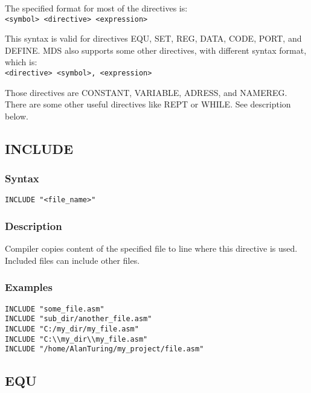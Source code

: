     \bigskip

    The specified format for most of the directives is:\\
    \verb'<symbol> <directive> <expression>'

    \bigskip

    This syntax is valid for directives EQU, SET, REG, DATA, CODE, PORT, and DEFINE. MDS also supports some other directives, with different syntax format, which is:\\
    \verb'<directive> <symbol>, <expression>'

    \bigskip

    Those directives are CONSTANT, VARIABLE, ADRESS, and NAMEREG. There are some other useful directives like REPT or WHILE. See description below.

    \clearpage
    \subsection{INCLUDE}
        \subsubsection{Syntax}
            \verb'INCLUDE "<file_name>"'

        \subsubsection{Description}
            Compiler copies content of the specified file to line where this directive is used. Included files can include other files.

        \subsubsection{Examples}
            \verb'INCLUDE "some_file.asm"'\\
            \verb'INCLUDE "sub_dir/another_file.asm"'\\
            \verb'INCLUDE "C:/my_dir/my_file.asm"'\\
            \verb'INCLUDE "C:\\my_dir\\my_file.asm"'\\
            \verb'INCLUDE "/home/AlanTuring/my_project/file.asm"'

    \subsection{EQU}
